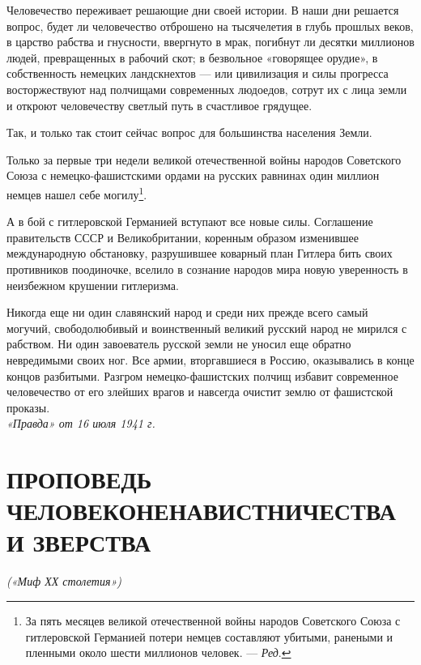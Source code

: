 \documentclass[12pt, a4paper, openany]{book}
\begin{document}
Человечество переживает решающие дни своей истории. В наши дни решается вопрос, будет ли человечество отброшено на тысячелетия в глубь прошлых веков, в царство рабства и гнусности, ввергнуто в мрак, погибнут ли десятки миллионов людей, превращенных в рабочий скот; в безвольное «говорящее орудие», в собственность немецких ландскнехтов — или цивилизация и силы прогресса восторжествуют над полчищами современных людоедов, сотрут их с лица земли и откроют человечеству светлый путь в счастливое грядущее.

Так, и только так стоит сейчас вопрос для большинства населения Земли.

Только за первые три недели великой отечественной войны народов Советского Союза с немецко-фашистскими ордами на русских равнинах один миллион немцев нашел себе могилу\footnote{За пять месяцев великой отечественной войны народов Советского Союза с гитлеровской Германией потери немцев составляют убитыми, ранеными и пленными около шести миллионов человек. — \textit{Ред}.}.

А в бой с гитлеровской Германией вступают все новые силы. Соглашение правительств СССР и Великобритании, коренным образом изменившее международную обстановку, разрушившее коварный план Гитлера бить своих противников поодиночке, вселило в сознание народов мира новую уверенность в неизбежном крушении гитлеризма.

Никогда еще ни один славянский народ и среди них прежде всего самый могучий, свободолюбивый и воинственный великий русский народ не мирился с рабством. Ни один завоеватель русской земли не уносил еще обратно невредимыми своих ног. Все армии, вторгавшиеся в Россию, оказывались в конце концов разбитыми. Разгром немецко-фашистских полчищ избавит современное человечество от его злейших врагов и навсегда очистит землю от фашистской проказы.
\ \\

\noindent\textit{«Правда» от 16 июля 1941 г.}

\newpage

\section[Проповедь человеконенавистничества и зверства \textit{(«Миф ХХ столетия»)}]{\center \textbf{ПРОПОВЕДЬ ЧЕЛОВЕКОНЕНАВИСТНИЧЕСТВА И ЗВЕРСТВА}}


\begin{center}
	\textit{(«Миф ХХ столетия»)}
\end{center}
\end{document}
